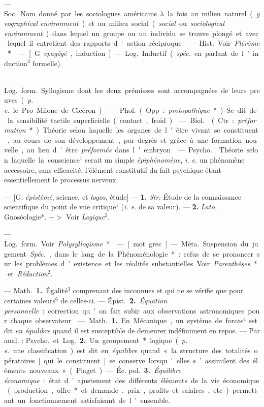 \begin{itemize}[leftmargin=1cm, label=, itemsep=1pt]
 — \si{Soc.} Nom donné par les sociologues américains à la
fois au milieu naturel ({\it geographical environment}) et au milieu social
({\it social} ou {\it sociological environment}) dans lequel un groupe ou un
individu se trouve plongé et avec lequel il entretient des rapports d'action
réciproque.

 — \si{Hist.} Voir {\it Plérôme}*.

 — [G. {\it epagôgé}, induction]
— \si{Log.} Inductif ({\it spéc.} en parlant
de l’induction$^2$ formelle).

 — \si{Log.} \si{form.} Syllogisme dont les deux
prémisses sont accompagnées de leurs
preuves ({\it p. e.} le Pro Milone de Cicéron).

 — \si{Phol.} (Opp. : {\it protopathique}*). Se dit
de la sensibilité tactile superficielle (contact, froid).

 — \si{Biol.}  (Ctr.: {\it préformation}*).
Théorie selon laquelle les organes de l'être vivant se constituent,
au cours de son développement, par degrés et grâce à une
formation nouvelle, au lieu d'être
{\it préformés} dans l'embryon.

 — \si{Psycho.} 
Théorie selon laquelle la conscience$^1$
serait un simple {\it épiphénomène}, {\it i. e.}
un phénomène accessoire, sans efficacité, l’élément constitutif du fait
psychique étant essentiellement le processus nerveux.

 — [G. {\it épistêmé}, science,
et {\it logos}, étude] — {\bf 1.} {\it Str.} Étude de
la connaissance scientifique du point
de vue critique$^1$ ({\it i. e.} de sa valeur).
— {\bf 2.} {\it Lato.} Gnoséologie*. $->$ Voir
{\it Logique}$^2$.

 — \si{Log.} \si{form.} Voir
{\it Polysyllogisme}*.

 — [mot grec] — \si{Méta.} Suspension du jugement.
{\it Spéc.}, dans le lang. de la Phénoménologie* : refus
de se prononcer sur les problèmes d'existence et les réalités
substantielles. Voir {\it Parenthèses}* et {\it Réduction}$^2$.

 — \si{Math.} {\bf 1.} Égalité$^3$ comprenant des
inconnues et qui ne se vérifie que pour certaines valeurs$^6$
de celles-ci. — \si{Épist.} {\bf 2.} {\it Équation
personnelle} : correction qu'on fait
subir aux observations astronomiques pour chaque observateur.

 — \si{Math.} {\bf 1.} En Mécanique,
un système de forces$^4$ est dit {\it en équilibre}
quand il est susceptible de demeurer indéfiniment en repos.
— Par anal. : \si{Psycho.} et \si{Log.} {\bf 2.} Un
groupement* logique ({\it p. e.} une classification) est dit en
{\it équilibre} quand « la structure des totalités opératoires
[qui le constituent] se conserve lorsqu'elles s’assimilent des
éléments nouveaux » (Piaget).
— \si{Éc. pol.} {\bf 3.} {\it Équilibre économique} :
état d'ajustement des différents éléments de la vie économique
(production, offre* et demande, prix, profits et salaires, etc.)
permettant un fonctionnement satisfaisant de l’ensemble.


\end{itemize}
